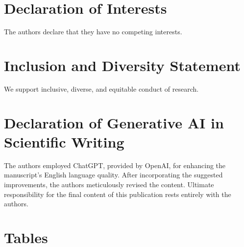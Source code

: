 \documentclass[preprint,review,12pt]{elsarticle}%
\begin{document}
\section*{Declaration of Interests}
The authors declare that they have no competing interests.
\label{declaration of interests}

\section*{Inclusion and Diversity Statement}
We support inclusive, diverse, and equitable conduct of research.
\label{inclusion and diversity statement}

\section*{Declaration of Generative AI in Scientific Writing}
The authors employed ChatGPT, provided by OpenAI, for enhancing the manuscript's English language quality. After incorporating the suggested improvements, the authors meticulously revised the content. Ultimate responsibility for the final content of this publication rests entirely with the authors.
\label{declaration of generative ai in scientific writing}


\clearpage
\section*{Tables}
\label{tables}
\end{document}
